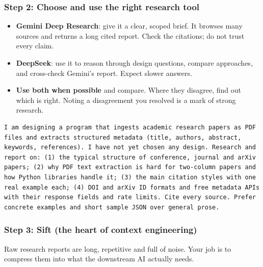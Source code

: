 \documentclass[11pt,a4paper]{article}
\begin{document}
\subsubsection{Step 2: Choose and use the right research tool}
\begin{itemize}
\item \textbf{Gemini Deep Research}: give it a clear, scoped brief. It browses many sources and returns a long cited report. Check the citations; do not trust every claim.
\item \textbf{DeepSeek}: use it to reason through design questions, compare approaches, and cross-check Gemini's report. Expect slower answers.
\item \textbf{Use both when possible} and compare. Where they disagree, find out which is right. Noting a disagreement you resolved is a mark of strong research.
\end{itemize}

\begin{tipbox}
\begin{lstlisting}[frame=none,backgroundcolor=\color{white},xleftmargin=0pt]
I am designing a program that ingests academic research papers as PDF
files and extracts structured metadata (title, authors, abstract,
keywords, references). I have not yet chosen any design. Research and
report on: (1) the typical structure of conference, journal and arXiv
papers; (2) why PDF text extraction is hard for two-column papers and
how Python libraries handle it; (3) the main citation styles with one
real example each; (4) DOI and arXiv ID formats and free metadata APIs
with their response fields and rate limits. Cite every source. Prefer
concrete examples and short sample JSON over general prose.
\end{lstlisting}
\end{tipbox}

\subsubsection{Step 3: Sift (the heart of context engineering)}
Raw research reports are long, repetitive and full of noise. Your job is to compress them into what the downstream AI actually needs.
\end{document}
